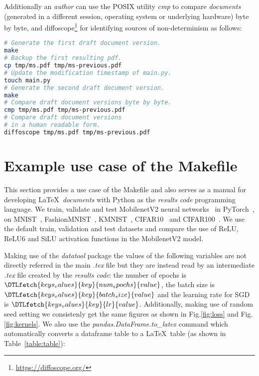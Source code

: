 \documentclass[journal]{IEEEtran}
\begin{document}
Additionally an \textit{author} can use the POSIX utility \textit{cmp} to compare \textit{documents} (generated in a different session, operating system or underlying hardware) byte by byte, and diffoscope\footnote{\url{https://diffoscope.org/}} for identifying sources of non-determinism as follows:
\begin{lstlisting}[language=bash, style=lststyle, caption={Test draft document version reproducibility. This can also be used as a test script when pushing or pull requesting to a remote repository.}]
# Generate the first draft document version.
make
# Backup the first resulting pdf.
cp tmp/ms.pdf tmp/ms-previous.pdf
# Update the modification timestamp of main.py.
touch main.py
# Generate the second draft document version.
make
# Compare draft document versions byte by byte.
cmp tmp/ms.pdf tmp/ms-previous.pdf
# Compare draft document versions
# in a human readable form.
diffoscope tmp/ms.pdf tmp/ms-previous.pdf
\end{lstlisting}

\section{Example use case of the Makefile}
This section provides a use case of the Makefile and also serves as a manual for developing \LaTeX\ \textit{documents} with Python as the \textit{results code} programming language.
We train, validate and test MobilenetV2 neural networks~\cite{sandler2018mobilenetv2} in PyTorch~\cite{paszke2019pytorch}, on MNIST~\cite{lecun2010mnist}, FashionMNIST~\cite{xiao2017fashion}, KMNIST~\cite{clanuwat2018deep}, CIFAR10~\cite{krizhevsky2009learning} and CIFAR100~\cite{krizhevsky2009learning}.
We use the default train, validation and test datasets and compare the use of ReLU, ReLU6\cite{dahl2013improving} and SiLU\cite{elfwing2018sigmoid} activation functions in the MobilenetV2 model.

Making use of the \textit{datatool} package the values of the following variables are not directly referred in the main \textit{.tex} file but they are instead read by an intermediate \textit{.tex} file created by the \textit{results code}: the number of epochs is $\DTLfetch{keys_values}{key}{num_epochs}{value}$, the batch size is $\DTLfetch{keys_values}{key}{batch_size}{value}$ and the learning rate for SGD is $\DTLfetch{keys_values}{key}{lr}{value}$.
Additionally, making use of random seed setting we consistenly get the same figures as shown in Fig.\ref{fig:loss} and Fig.\ref{fig:kernels}.
We also use the \textit{pandas.DataFrame.to\_latex} command which automatically converts a dataframe table to a \LaTeX\ table (as shown in Table~\ref{table:table}):
\end{document}
